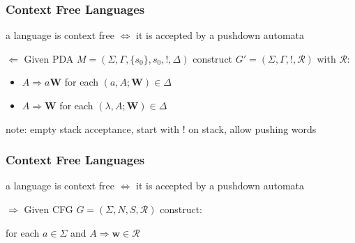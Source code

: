 \documentclass{beamer}
\begin{document}

\begin{frame}
\frametitle{Context Free Languages}
\begin{theorem}{}
  a language is context free $\iff$ it is accepted by a pushdown automata
\end{theorem}
\begin{block}{$\Leftarrow$}
  Given PDA $M = (\Sigma, \Gamma, \{s_0\}, s_0, !, \Delta)$ construct $G' =
  (\Sigma, \Gamma, !, \mathcal{R})$ with $\mathcal{R}$:
  \begin{itemize}
  \item $A \Rightarrow a\mathbf{W}$ for each $(a, A; \mathbf{W}) \in \Delta$
    \item $A \Rightarrow \mathbf{W}$ for each $(\lambda, A; \mathbf{W}) \in \Delta$
   \end{itemize}
  note: empty stack acceptance, start with ! on stack, allow pushing words
\end{block}
\end{frame}

\begin{frame}
\frametitle{Context Free Languages}
\begin{theorem}{}
  a language is context free $\iff$ it is accepted by a pushdown automata
\end{theorem}
\begin{block}{$\Rightarrow$}
  Given CFG $G = (\Sigma, N, S, \mathcal{R})$ construct:
\begin{figure}
  \centering
{}
  \end{figure}
  for each $a \in \Sigma$ and $A \Rightarrow \mathbf{w} \in \mathcal{R}$\\
\end{block}
\end{frame}

\end{document}

